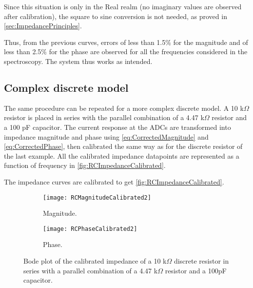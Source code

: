 Since this situation is only in the Real realm (no imaginary values are observed after calibration), the square to sine conversion is not needed, as proved in \autoref{sec:ImpedancePrinciples}. 

Thus, from the previous curves, errors of less than 1.5\% for the magnitude and of less than 2.5\% for the phase are observed for all the frequencies considered in the spectroscopy. The system thus works as intended. \par


\subsection{Complex discrete model}
The same procedure can be repeated for a more complex discrete model. A 10 k$\Omega$ resistor is placed in series with the parallel combination of a 4.47 k$\Omega$ resistor and a 100 pF capacitor. The current response at the ADCs are transformed into impedance magnitude and phase using \autoref{eq:CorrectedMagnitude} and \autoref{eq:CorrectedPhase}, then calibrated the same way as for the discrete resistor of the last example. All the calibrated impedance datapoints are represented as a function of frequency in \autoref{fig:RCImpedanceCalibrated}. \par

The impedance curves are calibrated to get \autoref{fig:RCImpedanceCalibrated}. \par
\begin{figure}[h]
\centering
\begin{subfigure}{0.99\textwidth}
\centering
    \texttt{[image: RCMagnitudeCalibrated2]}
    \caption{Magnitude.}
    \label{fig:RCMagnitudeCalibrated2}
\end{subfigure}
\begin{subfigure}{0.99\textwidth}
\centering
    \texttt{[image: RCPhaseCalibrated2]}
    \caption{Phase.}
    \label{fig:RCPhaseCalibrated2}
\end{subfigure}
\caption{Bode plot of the calibrated impedance of a 10 k$\Omega$ discrete resistor in series with a parallel combination of a 4.47 k$\Omega$ resistor and a 100pF capacitor.}
\label{fig:RCImpedanceCalibrated}
\end{figure}

